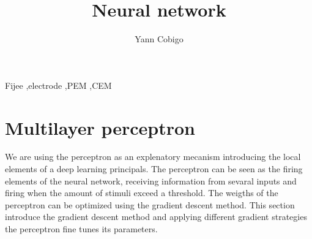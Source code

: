 \documentclass[final, paper=letter,5p,times,twocolumn]{elsarticle}
\begin{document}
\begin{frontmatter}

\title{Neural network}

\author[label1]{Yann Cobigo}
\address[label1]{University of California, San Francisco | ucsf.edu}




\begin{abstract}
 \lipsum[11-15]
\end{abstract}

\begin{keyword}
Fijee \sep electrode \sep PEM \sep CEM
\end{keyword}

\end{frontmatter}


\lipsum[100-104]

\section{Multilayer perceptron}

We are using the perceptron as an explenatory mecanism introducing the local elements of a deep learning principals. The perceptron can be seen as the firing elements of the neural network, receiving information from sevaral inputs and firing when the amount of stimuli exceed a threshold. The weigths of the perceptron can be optimized using the gradient descent method. This section introduce the gradient descent method and applying different gradient strategies the perceptron fine tunes its parameters.
\end{document}
